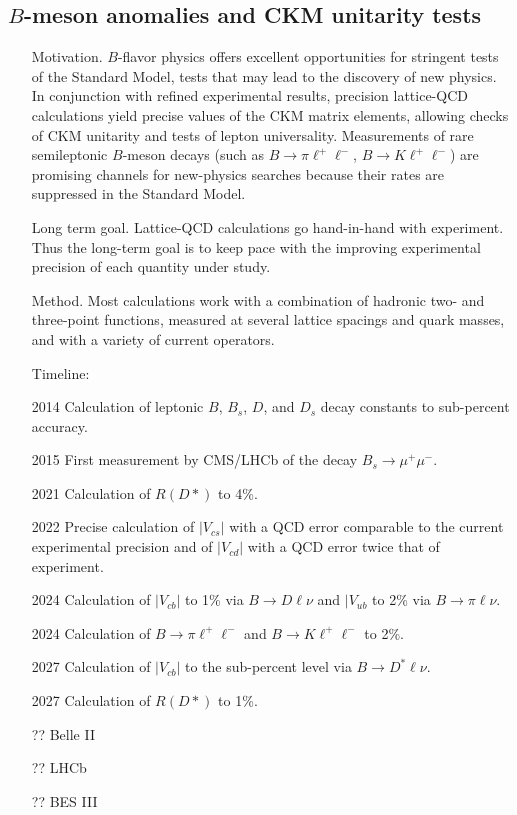 \documentclass[prd,showpacs,showkeys,preprintnumbers,floatfix,
nofootinbib%
]{revtex4-2}
\begin{document}
\subsection{$B$-meson anomalies and CKM unitarity tests}
\begin{itemize}
    \item[Motivation.] $B$-flavor physics offers excellent opportunities for stringent tests of the Standard Model, tests that may lead to the discovery of new physics. In conjunction with refined experimental results, precision lattice-QCD calculations yield precise values of the CKM matrix elements, allowing checks of CKM unitarity and tests of lepton universality. Measurements of rare semileptonic $B$-meson decays (such as $B\to\pi\ell^+\ell^-$, $B\to K\ell^+\ell^-$) are promising channels for new-physics searches because their rates are suppressed in the Standard Model.
    \item[Long term goal.] Lattice-QCD calculations go hand-in-hand with experiment.  Thus the long-term goal is to keep pace with the improving experimental precision of each quantity under study.
    \item[Method.] Most calculations work with a combination of hadronic two- and three-point functions, measured at several lattice spacings and quark masses, and with a variety of current operators. 
\item[Timeline:]
    \item[2014] Calculation of leptonic $B$, $B_s$, $D$, and $D_s$ decay constants to sub-percent accuracy.
    \item[2015] First measurement by CMS/LHCb of the decay $B_s \to \mu^+\mu^-$.
    \item[2021] Calculation of $R(D*)$ to 4\%.
    \item[2022] Precise calculation of $|V_{cs}|$ with a QCD error comparable to the current experimental precision and of $|V_{cd}|$ with a QCD error twice that of experiment.
    \item[2024] Calculation of $|V_{cb}|$ to 1\% via $B\to D\ell\nu$ and $|V_{ub}$ to 2\% via $B\to \pi\ell\nu$.
    \item[2024] Calculation of $B\to\pi \ell^+\ell^-$ and $B\to K \ell^+\ell^-$ to 2\%.
    \item[2027] Calculation of $|V_{cb}|$ to the sub-percent level via $B\to D^*\ell\nu$.
    \item[2027] Calculation of $R(D*)$ to 1\%.
    \item[??] Belle II
    \item[??] LHCb
    \item[??] BES III
\end{itemize}
\end{document}
